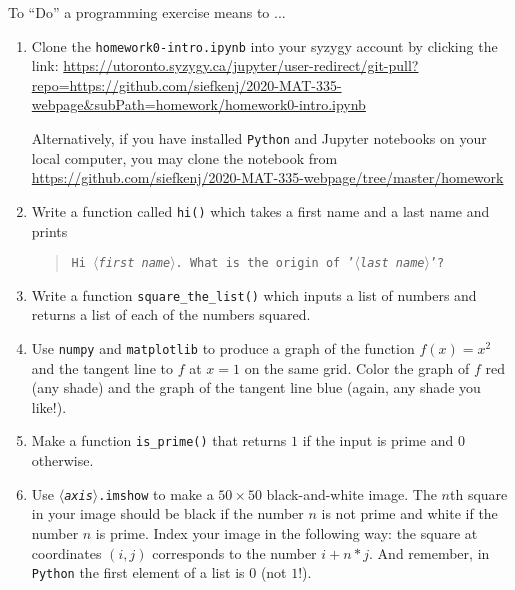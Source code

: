 \documentclass[letter]{article}
\newcommand{\var}[1]{{$\langle$\it #1$\rangle$}}
\begin{document}
\begin{enumerate}
			To ``Do'' a programming exercise means to ...
		\begin{enumerate}
			\item Clone the {\tt homework0-intro.ipynb} into your syzygy account by clicking the link:
				\url{https://utoronto.syzygy.ca/jupyter/user-redirect/git-pull?repo=https://github.com/siefkenj/2020-MAT-335-webpage&subPath=homework/homework0-intro.ipynb}

				Alternatively, if you have installed {\tt Python} and Jupyter notebooks on your local computer, you may
				clone the notebook from \url{https://github.com/siefkenj/2020-MAT-335-webpage/tree/master/homework}
			\item Write a function called {\tt hi()} which takes a first name and a last name and prints 
				\begin{quote}{\tt Hi \var{first name}. What is the origin of '\var{last name}'?}\end{quote}
			\item Write a function \verb|square_the_list()| which inputs a list of numbers and returns
				a list of each of the numbers squared.
			\item Use {\tt numpy} and {\tt matplotlib} to produce a graph of the function $f(x)=x^2$ and the tangent
				line to $f$ at $x=1$ on the same grid. Color the graph of $f$ red (any shade) and the graph of the
				tangent line blue (again, any shade you like!). 
			\item Make a function \verb|is_prime()| that returns $1$ if the input is prime and $0$ otherwise.
			\item Use {\tt \var{axis}.imshow} to make a $50\times 50$ black-and-white image. The $n$th square in your
				image should be black if the number $n$ is not prime and white if the number $n$ is prime. Index your image
				in the following way: the square at coordinates $(i,j)$ corresponds to the number $i+n*j$. 
				And remember, in {\tt Python} the first element of a list is $0$ (not $1$!).
		\end{enumerate}
	\end{enumerate}
\end{document}
